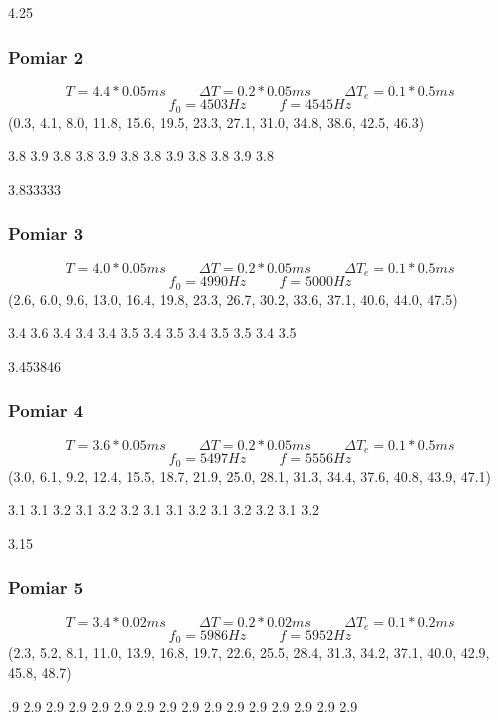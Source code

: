 \documentclass[12pt,a4paper]{article}
\begin{document}
4.25
\subsubsection{Pomiar 2}
$$
T = 4.4*0.05ms \hspace{1cm} \Delta T = 0.2*0.05ms \hspace{1cm} \Delta T_e = 0.1*0.5ms 
$$
$$
f_0 = 4503 Hz \hspace{1cm} f=4545Hz
$$
(0.3, 4.1, 8.0, 11.8, 15.6, 19.5, 23.3, 27.1, 31.0, 34.8, 38.6, 42.5, 46.3)

3.8 3.9 3.8 3.8 3.9 3.8 3.8 3.9 3.8 3.8 3.9 3.8

3.833333
\subsubsection{Pomiar 3}
$$
T = 4.0*0.05ms \hspace{1cm} \Delta T = 0.2*0.05ms \hspace{1cm} \Delta T_e = 0.1*0.5ms 
$$
$$
f_0 = 4990 Hz \hspace{1cm} f=5000Hz
$$
(2.6, 6.0, 9.6, 13.0, 16.4, 19.8, 23.3, 26.7, 30.2, 33.6, 37.1, 40.6, 44.0, 47.5)

3.4 3.6 3.4 3.4 3.4 3.5 3.4 3.5 3.4 3.5 3.5 3.4 3.5

3.453846
\subsubsection{Pomiar 4}
$$
T = 3.6*0.05ms \hspace{1cm} \Delta T = 0.2*0.05ms \hspace{1cm} \Delta T_e = 0.1*0.5ms 
$$
$$
f_0 = 5497 Hz \hspace{1cm} f=5556Hz
$$
(3.0, 6.1, 9.2, 12.4, 15.5, 18.7, 21.9, 25.0, 28.1, 31.3, 34.4, 37.6, 40.8, 43.9, 47.1)

3.1 3.1 3.2 3.1 3.2 3.2 3.1 3.1 3.2 3.1 3.2 3.2 3.1 3.2

3.15
\subsubsection{Pomiar 5}
$$
T = 3.4*0.02ms \hspace{1cm} \Delta T = 0.2*0.02ms \hspace{1cm} \Delta T_e = 0.1*0.2ms 
$$
$$
f_0 = 5986 Hz \hspace{1cm} f=5952Hz
$$
(2.3, 5.2, 8.1, 11.0, 13.9, 16.8, 19.7, 22.6, 25.5, 28.4, 31.3, 34.2, 37.1, 40.0, 42.9, 45.8, 48.7) 

.9 2.9 2.9 2.9 2.9 2.9 2.9 2.9 2.9 2.9 2.9 2.9 2.9 2.9 2.9 2.9
\end{document}
